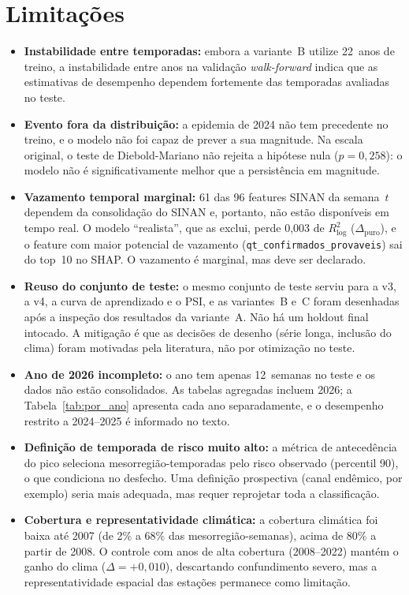 \section{Limitações}
\label{sec:limitacoes}

\begin{itemize}
    \item \textbf{Instabilidade entre temporadas:} embora a variante~B utilize 22~anos de treino, a instabilidade entre anos na validação \textit{walk-forward} indica que as estimativas de desempenho dependem fortemente das temporadas avaliadas no teste.
    \item \textbf{Evento fora da distribuição:} a epidemia de 2024 não tem precedente no treino, e o modelo não foi capaz de prever a sua magnitude. Na escala original, o teste de Diebold-Mariano não rejeita a hipótese nula ($p=0{,}258$): o modelo não é significativamente melhor que a persistência em magnitude.
    \item \textbf{Vazamento temporal marginal:} 61 das 96 features SINAN da semana~$t$ dependem da consolidação do SINAN e, portanto, não estão disponíveis em tempo real. O modelo ``realista'', que as exclui, perde 0,003 de $R^2_{\log}$ ($\Delta_{\mathrm{puro}}$), e o feature com maior potencial de vazamento (\texttt{qt\_confirmados\_provaveis}) sai do top~10 no SHAP. O vazamento é marginal, mas deve ser declarado.
    \item \textbf{Reuso do conjunto de teste:} o mesmo conjunto de teste serviu para a v3, a v4, a curva de aprendizado e o PSI, e as variantes~B e~C foram desenhadas após a inspeção dos resultados da variante~A. Não há um holdout final intocado. A mitigação é que as decisões de desenho (série longa, inclusão do clima) foram motivadas pela literatura, não por otimização no teste.
    \item \textbf{Ano de 2026 incompleto:} o ano tem apenas 12~semanas no teste e os dados não estão consolidados. As tabelas agregadas incluem 2026; a Tabela~\ref{tab:por_ano} apresenta cada ano separadamente, e o desempenho restrito a 2024--2025 é informado no texto.
    \item \textbf{Definição de temporada de risco muito alto:} a métrica de antecedência do pico seleciona mesorregião-temporadas pelo risco observado (percentil 90), o que condiciona no desfecho. Uma definição prospectiva (canal endêmico, por exemplo) seria mais adequada, mas requer reprojetar toda a classificação.
    \item \textbf{Cobertura e representatividade climática:} a cobertura climática foi baixa até 2007 (de 2\% a 68\% das mesorregião-semanas), acima de 80\% a partir de 2008. O controle com anos de alta cobertura (2008--2022) mantém o ganho do clima ($\Delta=+0{,}010$), descartando confundimento severo, mas a representatividade espacial das estações permanece como limitação.

\end{itemize}
